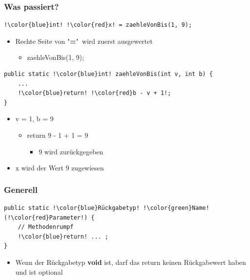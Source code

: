 \documentclass[final]{beamer}
\begin{document}
\begin{frame}[containsverbatim]
	\frametitle{Was passiert?}
	\begin{lstlisting}[escapechar=!]
!\color{blue}int! !\color{red}x! = zaehleVonBis(1, 9);
	\end{lstlisting}
	\begin{itemize}
		\item{Rechte Seite von "\textbf{=}"\ wird zuerst ausgewertet
			\begin{itemize}
				\item{zaehleVonBis(1, 9);}
			\end{itemize}
		}
	\end{itemize}
	\begin{lstlisting}[escapechar=!]
public static !\color{blue}int! zaehleVonBis(int v, int b) {
	...
	!\color{blue}return! !\color{red}b - v + 1!;
}
	\end{lstlisting}
	\begin{itemize}
		\item{v = 1, b = 9
			\begin{itemize}
				\item{return 9 - 1 + 1 = 9}
					\begin{itemize}
						\item{9 wird zurückgegeben}
					\end{itemize}
			\end{itemize}
		}
		\item{{\color{red}x} wird der Wert 9 zugewiesen}
	\end{itemize}
\end{frame}

\begin{frame}[containsverbatim]
	\frametitle{Generell}
	\begin{lstlisting}[escapechar=!]
public static !\color{blue}Rückgabetyp! !\color{green}Name! (!\color{red}Parameter!) {
	// Methodenrumpf
	!\color{blue}return! ... ; 
}
	\end{lstlisting}
	\begin{itemize}
		\item{Wenn der {\color{blue}Rückgabetyp} \textbf{void} ist, darf das {\color{blue}return} keinen Rückgabewert haben und ist optional}
	\end{itemize}
\end{frame}
\end{document}
